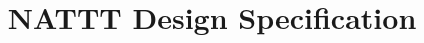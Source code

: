 \documentclass{article}
\begin{document}
\title{NATTT Design Specification}

\maketitle



















\end{document}
